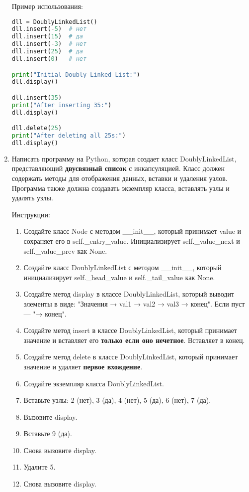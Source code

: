 \begin{enumerate}
Пример использования:
\begin{lstlisting}[language=Python]
dll = DoublyLinkedList()
dll.insert(-5)  # нет
dll.insert(15)  # да
dll.insert(-3)  # нет
dll.insert(25)  # да
dll.insert(0)   # нет

print("Initial Doubly Linked List:")
dll.display()

dll.insert(35)
print("After inserting 35:")
dll.display()

dll.delete(25)
print("After deleting all 25s:")
dll.display()
\end{lstlisting}

\item Написать программу на Python, которая создает класс DoublyLinkedList, представляющий \textbf{двусвязный список} с инкапсуляцией. Класс должен содержать методы для отображения данных, вставки и удаления узлов. Программа также должна создавать экземпляр класса, вставлять узлы и удалять узлы.

Инструкции:
\begin{enumerate}
    \item Создайте класс Node с методом \_\_init\_\_, который принимает value и сохраняет его в self.\_entry\_value. Инициализирует self.\_value\_next и self.\_value\_prev как None.
    \item Создайте класс DoublyLinkedList с методом \_\_init\_\_, который инициализирует self.\_head\_value и self.\_tail\_value как None.
    \item Создайте метод display в классе DoublyLinkedList, который выводит элементы в виде: "Значения → val1 → val2 → val3 → конец". Если пуст — "→ конец".
    \item Создайте метод insert в классе DoublyLinkedList, который принимает значение и вставляет его \textbf{только если оно нечетное}. Вставляет в конец.
    \item Создайте метод delete в классе DoublyLinkedList, который принимает значение и удаляет \textbf{первое вхождение}.
    \item Создайте экземпляр класса DoublyLinkedList.
    \item Вставьте узлы: 2 (нет), 3 (да), 4 (нет), 5 (да), 6 (нет), 7 (да).
    \item Вызовите display.
    \item Вставьте 9 (да).
    \item Снова вызовите display.
    \item Удалите 5.
    \item Снова вызовите display.
\end{enumerate}


\end{enumerate}
